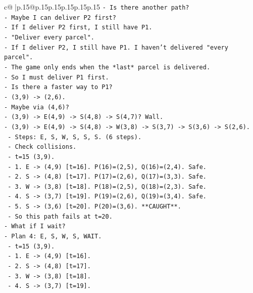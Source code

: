 \documentclass{article}
\begin{document}
{\begin{supertabular}{c@{$\;$}|p{.15\linewidth}@{}p{.15\linewidth}p{.15\linewidth}p{.15\linewidth}p{.15\linewidth}p{.15\linewidth}}
{{{\texttt{{-} Is there another path?} \\
\texttt{{-} Maybe I can deliver P2 first?} \\
\texttt{{-} If I deliver P2 first, I still have P1.} \\
\texttt{{-} "Deliver every parcel".} \\
\texttt{{-} If I deliver P2, I still have P1. I haven't delivered "every parcel".} \\
\texttt{{-} The game only ends when the *last* parcel is delivered.} \\
\texttt{{-} So I must deliver P1 first.} \\
\texttt{{-} Is there a faster way to P1?} \\
\texttt{{-} (3,9) {-}> (2,6).} \\
\texttt{{-} Maybe via (4,6)?} \\
\texttt{{-} (3,9) {-}> E(4,9) {-}> S(4,8) {-}> S(4,7)? Wall.} \\
\texttt{{-} (3,9) {-}> E(4,9) {-}> S(4,8) {-}> W(3,8) {-}> S(3,7) {-}> S(3,6) {-}> S(2,6).} \\
\texttt{  {-} Steps: E, S, W, S, S, S. (6 steps).} \\
\texttt{  {-} Check collisions.} \\
\texttt{  {-} t=15 (3,9).} \\
\texttt{  {-} 1. E {-}> (4,9) {[}t=16{]}. P(16)=(2,5), Q(16)=(2,4). Safe.} \\
\texttt{  {-} 2. S {-}> (4,8) {[}t=17{]}. P(17)=(2,6), Q(17)=(3,3). Safe.} \\
\texttt{  {-} 3. W {-}> (3,8) {[}t=18{]}. P(18)=(2,5), Q(18)=(2,3). Safe.} \\
\texttt{  {-} 4. S {-}> (3,7) {[}t=19{]}. P(19)=(2,6), Q(19)=(3,4). Safe.} \\
\texttt{  {-} 5. S {-}> (3,6) {[}t=20{]}. P(20)=(3,6). **CAUGHT**.} \\
\texttt{  {-} So this path fails at t=20.} \\
\texttt{{-} What if I wait?} \\
\texttt{{-} Plan 4: E, S, W, S, WAIT.} \\
\texttt{  {-} t=15 (3,9).} \\
\texttt{  {-} 1. E {-}> (4,9) {[}t=16{]}.} \\
\texttt{  {-} 2. S {-}> (4,8) {[}t=17{]}.} \\
\texttt{  {-} 3. W {-}> (3,8) {[}t=18{]}.} \\
\texttt{  {-} 4. S {-}> (3,7) {[}t=19{]}.} \\
}}}
\end{supertabular}}
\end{document}
